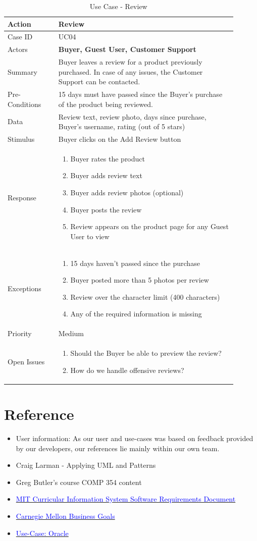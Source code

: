 \documentclass[11pt]{article}
\newcounter{use case ID}
\newcommand\tabularhead[1]{
    \begin{table}[ht]
        \addtocounter{use case ID}{1}
        \caption{Use Case \arabic{use case ID} - #1}
        \vspace{0.2cm}
        \begin{tabular}{|p{0.2\linewidth}|p{0.70\linewidth}|}
            \hline
            \textbf{Action} & \textbf{#1} \\
            \hline}
\newcommand\addrow[2]{#1 & #2\\ \hline}
\newcommand\addmulrow[2]{ \begin{minipage}[t][][t]{2.5cm}#1\end{minipage}
                &\begin{minipage}[t][][t]{11cm}
                    \begin{enumerate}[itemsep=-1ex] #2   \end{enumerate}
                \end{minipage}\vfill\\ \hline}
\newenvironment{usecase}{\tabularhead}
        {\hline\end{tabular}\end{table}}
\newcounter{req ID}
\begin{document}
\begin{usecase}{Review}
    \addrow{Case ID}{UC04}
    \addrow{Actors}{\textbf{Buyer, Guest User, Customer Support}}
    \addrow{Summary}{Buyer leaves a review for a product previously purchased. In case of any issues, the Customer Support can be contacted.}
    \addrow{Pre-Conditions}{
        15 days must have passed since the Buyer’s purchase of the product being reviewed.
        }
    \addrow{Data}{
Review text, review photo, days since purchase, Buyer’s username, rating (out of 5 stars)
}
    \addrow{Stimulus}{Buyer clicks on the Add Review button}
    \addmulrow{Response}{
        \item Buyer rates the product
        \item Buyer adds review text
        \item Buyer adds review photos (optional)
        \item Buyer posts the review
        \item Review appears on the product page for any Guest User to view
    }
    \addmulrow{Exceptions}{
        \item 15 days haven’t passed since the purchase
        \item Buyer posted more than 5 photos per review
        \item Review over the character limit (400 characters)
        \item Any of the required information is missing
    }
    \addrow{Priority}{Medium}
    \addmulrow{Open Issues}{
        \item Should the Buyer be able to preview the review?
        \item How do we handle offensive reviews?
    }
\end{usecase}

\clearpage

\section{Reference}



\begin{itemize}
    \item User information: As our user and use-cases was based on feedback provided by our developers, our references lie mainly within our own team.
    \item Craig Larman - Applying UML and Patterns
    \item Greg Butler's course COMP 354 content
    \item \href{http://web.mit.edu/ssit/cis/CISRequirements.html}{\textcolor{blue}{MIT Curricular Information System
        Software Requirements Document}}
    \item \href{https://resources.sei.cmu.edu/asset_files/TechnicalReport/2005_005_001_14621.pdf}{\textcolor{blue}{Carnegie Mellon Business Goals}}
    \item \href{http://www.oracle.com/technetwork/testcontent/gettingstartedwithusecasemodeling-133857.pdf}{\textcolor{blue}{Use-Case: Oracle }}

\end{itemize}
\end{document}
